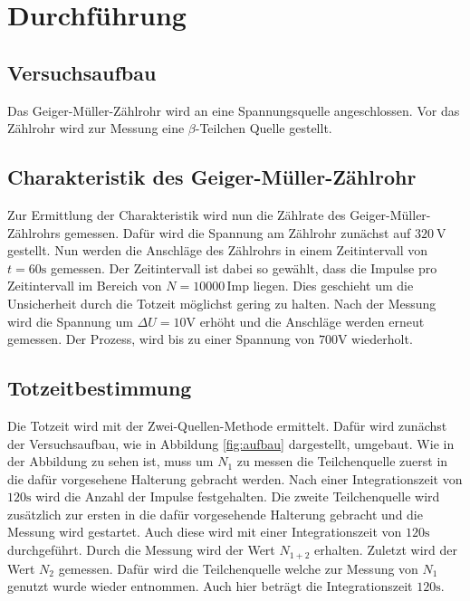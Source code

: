 \section{Durchführung}
\label{sec:Durchführung}
\subsection{Versuchsaufbau}
Das Geiger-Müller-Zählrohr wird an eine Spannungsquelle angeschlossen.
Vor das Zählrohr wird zur Messung eine $\beta$-Teilchen Quelle gestellt.

\subsection{Charakteristik des Geiger-Müller-Zählrohr}
\label{subsec:charak}
Zur Ermittlung der Charakteristik wird nun die Zählrate des Geiger-Müller-Zählrohrs gemessen.
Dafür wird die Spannung am Zählrohr zunächst auf $\SI{320}{\V}$ gestellt.
Nun werden die Anschläge des Zählrohrs in einem Zeitintervall von $t=60\si{\second}$ gemessen.
Der Zeitintervall ist dabei so gewählt, dass die Impulse pro Zeitintervall im Bereich von $N=10000 \, \text{Imp}$ liegen.
Dies geschieht um die Unsicherheit durch die Totzeit möglichst gering zu halten.
Nach der Messung wird die Spannung um $\Delta U = 10\si{\V}$ erhöht und die Anschläge werden erneut gemessen.
Der Prozess, wird bis zu einer Spannung von $700\si{\V}$ wiederholt.
\FloatBarrier
\subsection{Totzeitbestimmung}
\label{subsec:tot}
Die Totzeit wird mit der Zwei-Quellen-Methode ermittelt.
Dafür wird zunächst der Versuchsaufbau, wie in Abbildung \ref{fig:aufbau} dargestellt, umgebaut.
Wie in der Abbildung zu sehen ist, muss um $N_1$ zu messen die Teilchenquelle zuerst in die dafür vorgesehene Halterung gebracht werden.
Nach einer Integrationszeit von $120\si{\second}$ wird die Anzahl der Impulse festgehalten.
Die zweite Teilchenquelle wird zusätzlich zur ersten in die dafür vorgesehende Halterung gebracht und die Messung wird gestartet.
Auch diese wird mit einer Integrationszeit von $120 \si{\second}$ durchgeführt.
Durch die Messung wird der Wert $N_{1+2}$ erhalten.
Zuletzt wird der Wert $N_2$ gemessen.
Dafür wird die Teilchenquelle welche zur Messung von $N_1$ genutzt wurde wieder entnommen.
Auch hier beträgt die Integrationszeit $120\si{\second}$.

